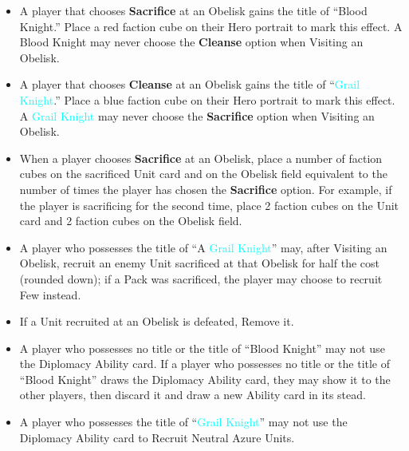 \begin{multicols*}{2}
\begin{itemize}
\begin{enumerate}[leftmargin=15pt]
\begin{enumerate}
            \item {}: Gain 18 , 9 , and 3 . Additionally, \textbf{Search (2)} the Relic card deck. Finally, if the Unit Card was on the Pack side, \textbf{Search (2)} the  Unit deck; you may Recruit one of these Units for half the cost (rounded down).
        \end{enumerate}
    \end{enumerate}
    \item A player that chooses \textbf{Sacrifice} at an Obelisk gains the title of “\textcolor{darkcandyapplered}{Blood Knight}.” Place a red faction cube on their Hero portrait to mark this effect. A \textcolor{darkcandyapplered}{Blood Knight} may never choose the \textbf{Cleanse} option when Visiting an Obelisk.
    \item A player that chooses \textbf{Cleanse} at an Obelisk gains the title of “\textcolor{cyan}{Grail Knight}.” Place a blue faction cube on their Hero portrait to mark this effect. A \textcolor{cyan}{Grail Knight} may never choose the \textbf{Sacrifice} option when Visiting an Obelisk.
    \item When a player chooses \textbf{Sacrifice} at an Obelisk, place a number of faction cubes on the sacrificed Unit card and on the Obelisk field equivalent to the number of times the player has chosen the \textbf{Sacrifice} option. For example, if the player is sacrificing for the second time, place 2 faction cubes on the Unit card and 2 faction cubes on the Obelisk field.
    \item A player who possesses the title of “A \textcolor{cyan}{Grail Knight}” may, after Visiting an Obelisk, recruit an enemy Unit sacrificed at that Obelisk for half the cost (rounded down); if a Pack was sacrificed, the player may choose to recruit Few instead.
    \item If a Unit recruited at an Obelisk is defeated, Remove it.
    \item A player who possesses no title or the title of “\textcolor{darkcandyapplered}{Blood Knight}” may not use the Diplomacy Ability card. If a player who possesses no title or the title of “\textcolor{darkcandyapplered}{Blood Knight}” draws the Diplomacy Ability card, they may show it to the other players, then discard it and draw a new Ability card in its stead.
    \item A player who possesses the title of “\textcolor{cyan}{Grail Knight}” may not use the Diplomacy Ability card to Recruit Neutral Azure Units.

\end{itemize}
\end{multicols*}
